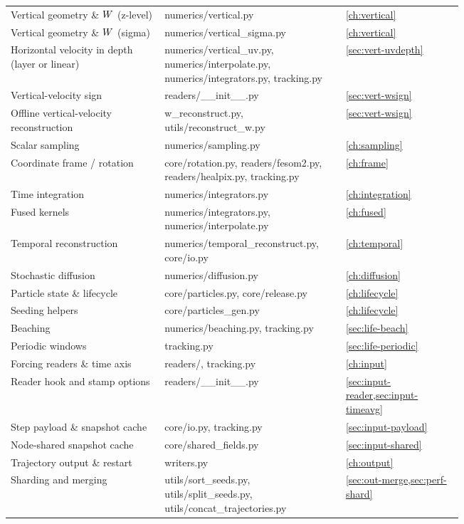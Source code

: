 \begin{longtable}{@{}>{\footnotesize}p{0.34\linewidth} >{\ttfamily\footnotesize\raggedright\arraybackslash}p{0.40\linewidth} >{\footnotesize}l@{}}
Vertical geometry \& $W$ (z-level) & numerics/vertical.py & \cref{ch:vertical} \\
Vertical geometry \& $W$ (sigma) & numerics/vertical\_sigma.py & \cref{ch:vertical} \\
Horizontal velocity in depth (layer or linear) & numerics/vertical\_uv.py, numerics/interpolate.py, numerics/integrators.py, tracking.py & \cref{sec:vert-uvdepth} \\
Vertical-velocity sign & readers/\_\_init\_\_.py & \cref{sec:vert-wsign} \\
Offline vertical-velocity reconstruction & w\_reconstruct.py, utils/reconstruct\_w.py & \cref{sec:vert-wsign} \\
Scalar sampling & numerics/sampling.py & \cref{ch:sampling} \\
Coordinate frame / rotation & core/rotation.py, readers/fesom2.py, readers/healpix.py, tracking.py & \cref{ch:frame} \\
Time integration & numerics/integrators.py & \cref{ch:integration} \\
Fused kernels & numerics/integrators.py, numerics/interpolate.py & \cref{ch:fused} \\
Temporal reconstruction & numerics/temporal\_reconstruct.py, core/io.py & \cref{ch:temporal} \\
Stochastic diffusion & numerics/diffusion.py & \cref{ch:diffusion} \\
Particle state \& lifecycle & core/particles.py, core/release.py & \cref{ch:lifecycle} \\
Seeding helpers & core/particles\_gen.py & \cref{ch:lifecycle} \\
Beaching & numerics/beaching.py, tracking.py & \cref{sec:life-beach} \\
Periodic windows & tracking.py & \cref{sec:life-periodic} \\
Forcing readers \& time axis & readers/, tracking.py & \cref{ch:input} \\
Reader hook and stamp options & readers/\_\_init\_\_.py & \cref{sec:input-reader,sec:input-timeavg} \\
Step payload \& snapshot cache & core/io.py, tracking.py & \cref{sec:input-payload} \\
Node-shared snapshot cache & core/shared\_fields.py & \cref{sec:input-shared} \\
Trajectory output \& restart & writers.py & \cref{ch:output} \\
Sharding and merging & utils/sort\_seeds.py, utils/split\_seeds.py, utils/concat\_trajectories.py & \cref{sec:out-merge,sec:perf-shard} \\

\end{longtable}
